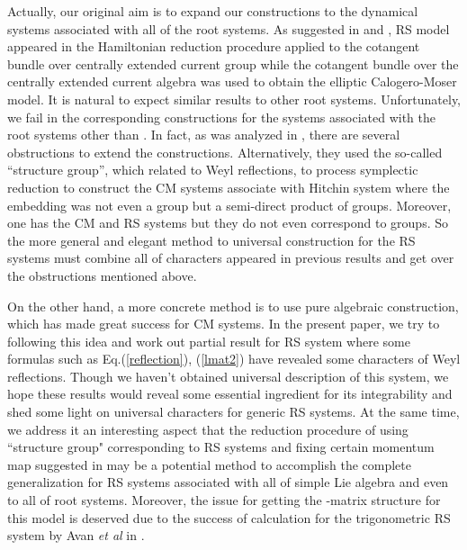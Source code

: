 \documentclass[a4paper,12pt]{article}
\begin{document}
Actually, our original aim is to expand our constructions to
the dynamical systems associated with all of the root systems.
As suggested in \cite{GN95} and \cite{aru}, \coordHE{} RS
model appeared in the Hamiltonian reduction procedure
applied to the cotangent bundle over centrally extended
current group while the cotangent bundle over the
centrally extended current algebra was used to obtain the
elliptic Calogero-Moser model\cite{GN94,AM95}. It is natural
to expect similar results to other root systems.
Unfortunately, we fail in the corresponding constructions for the
systems associated with the root systems other than
\coordHE{}. In fact, as was analyzed in \cite{hm}, there are several
obstructions to extend the constructions.
Alternatively, they used the so-called ``structure group'',
which related to  Weyl reflections, to process symplectic
reduction to construct the CM systems associate with Hitchin
system where the embedding was not even a group but a semi-direct
product of groups. Moreover, one has the \coordHE{} CM and RS
systems but they do not even correspond to groups. So the
more general and elegant method to universal construction
for the RS systems must combine all of characters appeared
in previous results and get over the obstructions mentioned
above.

On the other hand, a more concrete method is to use
pure algebraic construction, which has made great success
for CM systems\cite{hp1,bcs,bcs2,bcs3,bcs1}. In the present
paper, we try to following this idea and work out partial
result for \coordHE{} RS system where some formulas such as
Eq.(\ref{reflection}), (\ref{lmat2}) have revealed some characters
of Weyl reflections. Though we haven't obtained universal description of this system,
we hope these results would reveal some essential
ingredient for its integrability and shed some light on
universal characters for generic RS systems. At the same time, we
address it an interesting aspect that the reduction procedure of using ``structure group" corresponding to
RS systems and fixing certain momentum map
suggested in \cite{N96,hm} may be a potential method to accomplish
the complete generalization for RS systems associated with all of
simple Lie algebra and even to all of root systems.
Moreover, the issue for getting the \coordHE{}-matrix structure for
this model is deserved due to the success of calculation for the
trigonometric \coordHE{} RS system by Avan \textit{et al} in \cite{Avan}.
\end{document}

